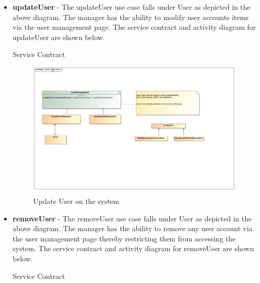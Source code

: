 \documentclass[english]{article}
\begin{document}
\begin{itemize}
\begin{figure}[H]
	  			\end{figure}
	  
	  		\item \textbf{updateUser} - The updateUser use case falls under User as depicted in the above diagram. The manager has the ability to modify user accounts items via the user management page. The service contract and activity diagram for updateUser are shown below.
	  		
	  		\newpage
	  			\begin{center}
	  				Service Contract
	  			\end{center}
	  			
	  			\begin{figure}[H]
	  				\begin{center}
	  					\includegraphics[scale=0.25]{UpdateUserContract.jpg}
	  				\end{center}
	  				\caption{Update User on the system}
	  				
	  			\end{figure}
	  		
	  			
			\item \textbf{removeUser} - The removeUser use case falls under User as depicted in the above diagram. The manager has the ability to remove any user account via the user management page thereby restricting them from accessing the system. The service contract and activity diagram for removeUser are shown below.
			\newpage
			\begin{center}
				Service Contract
			\end{center}
			

\end{itemize}
\end{document}
